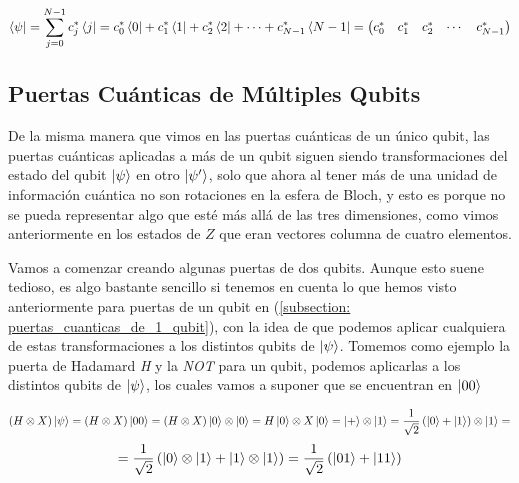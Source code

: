 \documentclass{article}
\numberwithin{equation}{section} %
\begin{document}
    \begin{equation}
        \bra{\psi} = \sum_{j = 0}^{N - 1} c_{j}^{*} \bra{j} = c_{0}^{*} \bra{0} + c_{1}^{*} \bra{1} + c_{2}^{*} \bra{2} + \cdots + c_{N - 1}^{*} \bra{N - 1} = \begin{pmatrix}
            c_{0}^{*} & c_{1}^{*} & c_{2}^{*} & \cdots & c_{N - 1}^{*}
        \end{pmatrix}
        \label{eq: bra_qubit_dimension_N_matriz}
    \end{equation}

    \vspace{10mm}

    


    \subsection{Puertas Cuánticas de Múltiples Qubits}

    \vspace{5mm}

    De la misma manera que vimos en las puertas cuánticas de un único qubit, las puertas cuánticas aplicadas a más de un qubit siguen siendo transformaciones del estado del qubit \( \ket{\psi} \) en otro \( \ket{\psi'} \), solo que ahora al tener más de una unidad de información cuántica no son rotaciones en la esfera de Bloch, y esto es porque no se pueda representar algo que esté más allá de las tres dimensiones, como vimos anteriormente en los estados de \( Z \) que eran vectores columna de cuatro elementos.

    \vspace{5mm}

    Vamos a comenzar creando algunas puertas de dos qubits. Aunque esto suene tedioso, es algo bastante sencillo si tenemos en cuenta lo que hemos visto anteriormente para puertas de un qubit en (\ref{subsection: puertas_cuanticas_de_1_qubit}), con la idea de que podemos aplicar cualquiera de estas transformaciones a los distintos qubits de \( \ket{\psi} \). Tomemos como ejemplo la puerta de Hadamard \textit{H} y la \textit{NOT} para un qubit, podemos aplicarlas a los distintos qubits de \( \ket{\psi} \), los cuales vamos a suponer que se encuentran en \( \ket{0 0} \)

    \begin{equation*}
        (H \otimes X) \ket{\psi} = (H \otimes X) \ket{0 0} = (H \otimes X) \ket{0} \otimes \ket{0} = H \ket{0} \otimes X \ket{0} = \ket{+} \otimes \ket{1} = \frac{1}{\sqrt{2}} \left( \ket{0} + \ket{1} \right) \otimes \ket{1} =
    \end{equation*}
    \begin{equation*}
        = \frac{1}{\sqrt{2}} \left( \ket{0} \otimes \ket{1} + \ket{1} \otimes \ket{1} \right) = \frac{1}{\sqrt{2}} \left( \ket{0 1} + \ket{1 1} \right)
    \end{equation*}
\end{document}
